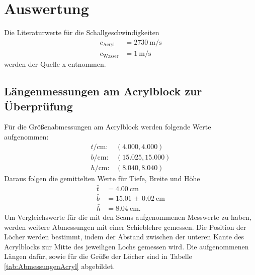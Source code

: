 \section{Auswertung}
\label{sec:Auswertung}

Die Literaturwerte für die Schallgeschwindigkeiten
\begin{align}
  c_\text{Acryl} & = \SI{2730}{\meter\per\second} \\
  c_\text{Wasser} & = \SI{1}{\meter\per\second}
\end{align}
werden der Quelle x entnommen.

\subsection{Längenmessungen am Acrylblock zur Überprüfung}

Für die Größenabmessungen am Acrylblock werden folgende Werte aufgenommen:
\begin{align}
  t/\si{\centi\meter}: & (4.000 , 4.000) \\
  b/\si{\centi\meter}: & (15.025 , 15.000) \\
  h/\si{\centi\meter}: & (8.040, 8.040)
\end{align}
Daraus folgen die gemittelten Werte für Tiefe, Breite und Höhe
\begin{align}
  \bar{t} & = \SI{4.00}{\centi\meter} \\
  \bar{b} & = \SI{15.01(2)}{\centi\meter} \\
  \bar{h} & = \SI{8.04}{\centi\meter}.
  \label{eqn:AbmessungenAcryl}
\end{align}
Um Vergleichswerte für die mit den Scans aufgenommenen Messwerte zu haben,
werden weitere Abmessungen mit einer Schieblehre gemessen.
Die Position der Löcher werden bestimmt, indem der Abstand zwischen der
unteren Kante des Acrylblocks zur Mitte des jeweiligen Lochs gemessen wird.
Die aufgenommenen Längen dafür, sowie für die Größe der Löcher sind in
Tabelle \ref{tab:AbmessungenAcryl} abgebildet.

